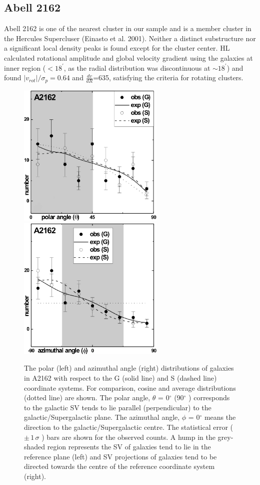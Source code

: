 \subsection{Abell 2162}
Abell 2162 is one of the nearest cluster in our sample and is a member cluster in the Hercules Supercluser (Einasto et al. 2001). Neither a distinct substructure nor a significant local density peaks is found except for the cluster center. HL calculated rotational amplitude and global velocity gradient using the galaxies at inner region ($<18^\prime$, as the radial distribution was discontinuous at $\sim 18^\prime$) and found ${|v_{rot}|}/{\sigma_p}= 0.64$ and $\frac{dv}{dR}$=635, satisfying the criteria for rotating clusters.
\begin{figure}[H]
\centering
\includegraphics[height=6.9cm]{A2162_theta.eps}
   \includegraphics[height=6.9cm]{A2162_phi.eps}
      \caption{The polar (left) and azimuthal angle (right) distributions of galaxies in A2162
with respect to the G (solid line) and S (dashed line) coordinate systems.
For comparison, cosine and average distributions (dotted line) are shown.
The polar angle, $\theta$ = 0$^\circ$ (90$^\circ$ ) corresponds to the galactic SV tends to lie
parallel (perpendicular) to the galactic/Supergalactic plane. The azimuthal
angle, $\phi$ = 0$^\circ$ means the direction to the galactic/Supergalactic centre. The
statistical error ($\pm\, 1\, \sigma$ ) bars are shown for the observed counts. A hump in the
grey-shaded region represents the SV of galaxies tend to lie in the reference
plane (left) and SV projections of galaxies tend to be directed towards the
centre of the reference coordinate system (right).}
\end{figure}

